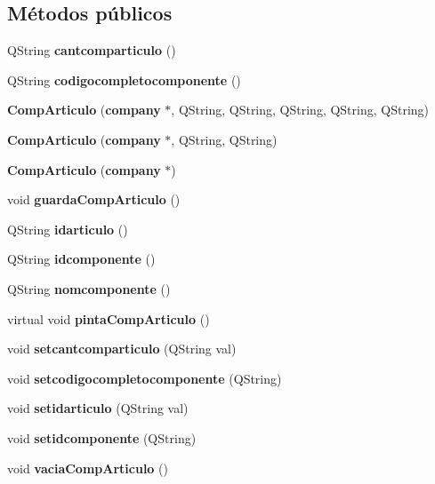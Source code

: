 \subsection*{M\'{e}todos p\'{u}blicos}
\begin{CompactItemize}
\item 
QString {\bf cantcomparticulo} ()\label{classCompArticulo_a0}

\item 
QString {\bf codigocompletocomponente} ()\label{classCompArticulo_a1}

\item 
{\bf Comp\-Articulo} ({\bf company} $\ast$, QString, QString, QString, QString, QString)
\item 
{\bf Comp\-Articulo} ({\bf company} $\ast$, QString, QString)\label{classCompArticulo_a3}

\item 
{\bf Comp\-Articulo} ({\bf company} $\ast$)\label{classCompArticulo_a4}

\item 
void {\bf guarda\-Comp\-Articulo} ()
\item 
QString {\bf idarticulo} ()\label{classCompArticulo_a6}

\item 
QString {\bf idcomponente} ()\label{classCompArticulo_a7}

\item 
QString {\bf nomcomponente} ()\label{classCompArticulo_a8}

\item 
virtual void {\bf pinta\-Comp\-Articulo} ()\label{classCompArticulo_a9}

\item 
void {\bf setcantcomparticulo} (QString val)\label{classCompArticulo_a10}

\item 
void {\bf setcodigocompletocomponente} (QString)\label{classCompArticulo_a11}

\item 
void {\bf setidarticulo} (QString val)\label{classCompArticulo_a12}

\item 
void {\bf setidcomponente} (QString)\label{classCompArticulo_a13}

\item 
void {\bf vacia\-Comp\-Articulo} ()\label{classCompArticulo_a14}

\end{CompactItemize}


